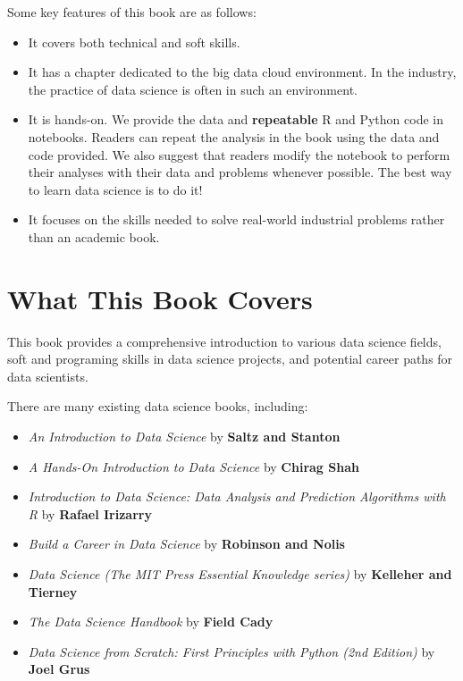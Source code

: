 \documentclass[
  12pt,
]{krantz}
\providecommand{\tightlist}{%
  \setlength{\itemsep}{0pt}\setlength{\parskip}{0pt}}
\begin{document}
Some key features of this book are as follows:

\begin{itemize}
\item
  It covers both technical and soft skills.
\item
  It has a chapter dedicated to the big data cloud environment. In the industry, the practice of data science is often in such an environment.
\item
  It is hands-on. We provide the data and \textbf{repeatable} R and Python code in notebooks. Readers can repeat the analysis in the book using the data and code provided. We also suggest that readers modify the notebook to perform their analyses with their data and problems whenever possible. The best way to learn data science is to do it!
\item
  It focuses on the skills needed to solve real-world industrial problems rather than an academic book.
\end{itemize}

\hypertarget{what-this-book-covers}{%
\section*{What This Book Covers}\label{what-this-book-covers}}


This book provides a comprehensive introduction to various data science fields, soft and programing skills in data science projects, and potential career paths for data scientists.

There are many existing data science books, including:

\begin{itemize}
\tightlist
\item
  \emph{An Introduction to Data Science} by \textbf{Saltz and Stanton}
\item
  \emph{A Hands-On Introduction to Data Science} by \textbf{Chirag Shah}
\item
  \emph{Introduction to Data Science: Data Analysis and Prediction Algorithms with R} by
  \textbf{Rafael Irizarry}
\item
  \emph{Build a Career in Data Science} by \textbf{Robinson and Nolis}
\item
  \emph{Data Science (The MIT Press Essential Knowledge series)} by \textbf{Kelleher and Tierney}
\item
  \emph{The Data Science Handbook} by \textbf{Field Cady}
\item
  \emph{Data Science from Scratch: First Principles with Python (2nd Edition)} by \textbf{Joel Grus}
\end{itemize}
\end{document}
